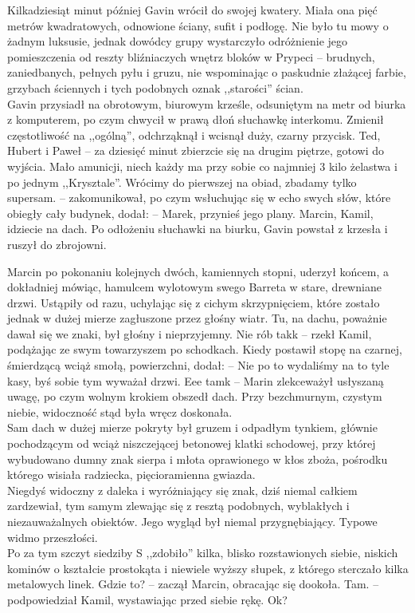 \documentclass[../MAIN.tex]{subfiles}
\begin{document}
Kilkadziesiąt minut później Gavin wrócił do swojej kwatery. Miała ona pięć metrów kwadratowych, odnowione ściany, sufit i podłogę. Nie było tu mowy o żadnym luksusie, jednak dowódcy grupy wystarczyło odróżnienie jego pomieszczenia od reszty bliźniaczych wnętrz bloków w Prypeci -- brudnych, zaniedbanych, pełnych pyłu i gruzu, nie wspominając o paskudnie złażącej farbie, grzybach ściennych i tych podobnych oznak ,,starości'' ścian.\\
Gavin przysiadł na obrotowym, biurowym krześle, odsuniętym na metr od biurka z komputerem, po czym chwycił w prawą dłoń słuchawkę interkomu. Zmienił częstotliwość na ,,ogólną'', odchrząknął i wcisnął duży, czarny przycisk.
\sx Ted, Hubert i Paweł -- za dziesięć minut zbierzcie się na drugim piętrze, gotowi do wyjścia. Mało amunicji, niech każdy ma przy sobie co najmniej 3 kilo żelastwa i po jednym ,,Krysztale''. Wrócimy do pierwszej na obiad, zbadamy tylko supersam. -- zakomunikował, po czym wsłuchując się w echo swych słów, które obiegły cały budynek, dodał: -- Marek, przynieś jego plany. Marcin, Kamil, idziecie na dach.
\qd
Po odłożeniu słuchawki na biurku, Gavin powstał z krzesła i ruszył do zbrojowni.

Marcin po pokonaniu kolejnych dwóch, kamiennych stopni, uderzył końcem, a dokładniej mówiąc, hamulcem wylotowym swego Barreta w stare, drewniane drzwi. Ustąpiły od razu, uchylając się z cichym skrzypnięciem, które zostało jednak w dużej mierze zagłuszone przez głośny wiatr. Tu, na dachu, poważnie dawał się we znaki, był głośny i nieprzyjemny.
\sx Nie rób tak\3k -- rzekł Kamil, podążając ze swym towarzyszem po schodkach. Kiedy postawił stopę na czarnej, śmierdzącą wciąż smołą, powierzchni, dodał: -- Nie po to wydaliśmy na to tyle kasy, byś sobie tym wyważał drzwi.
\xx Eee tam\3k -- Marin zlekceważył usłyszaną uwagę, po czym wolnym krokiem obszedł dach.
\qd
Przy bezchmurnym, czystym niebie, widoczność stąd była wręcz doskonała.\\
Sam dach w dużej mierze pokryty był gruzem i odpadłym tynkiem, głównie pochodzącym od wciąż niszczejącej betonowej klatki schodowej, przy której wybudowano dumny znak sierpa i młota oprawionego w kłos zboża, pośrodku którego wisiała radziecka, pięcioramienna gwiazda.\\
Niegdyś widoczny z daleka i wyróżniający się znak, dziś niemal całkiem zardzewiał, tym samym zlewając się z resztą podobnych, wyblakłych i niezauważalnych obiektów. Jego wygląd był niemal przygnębiający. Typowe widmo przeszłości.\\
Po za tym szczyt siedziby S ,,zdobiło'' kilka, blisko rozstawionych siebie, niskich kominów o kształcie prostokąta i niewiele wyższy słupek, z którego sterczało kilka metalowych linek.
\sx Gdzie to? -- zaczął Marcin, obracając się dookoła.
\xx Tam. -- podpowiedział Kamil, wystawiając przed siebie rękę.
\xx Ok?
\qd
\end{document}
